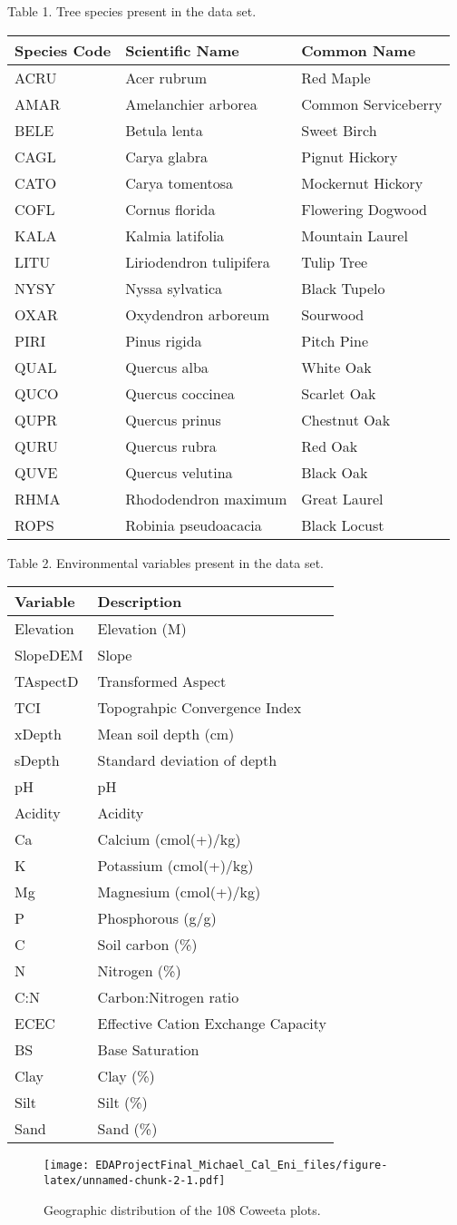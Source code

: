 \documentclass[
  12pt,
]{article}
\begin{document}
Table 1. Tree species present in the data set.

\begin{longtable}[]{@{}lll@{}}
\toprule
Species Code & Scientific Name & Common Name\tabularnewline
\midrule
\endhead
ACRU & Acer rubrum & Red Maple\tabularnewline
AMAR & Amelanchier arborea & Common Serviceberry\tabularnewline
BELE & Betula lenta & Sweet Birch\tabularnewline
CAGL & Carya glabra & Pignut Hickory\tabularnewline
CATO & Carya tomentosa & Mockernut Hickory\tabularnewline
COFL & Cornus florida & Flowering Dogwood\tabularnewline
KALA & Kalmia latifolia & Mountain Laurel\tabularnewline
LITU & Liriodendron tulipifera & Tulip Tree\tabularnewline
NYSY & Nyssa sylvatica & Black Tupelo\tabularnewline
OXAR & Oxydendron arboreum & Sourwood\tabularnewline
PIRI & Pinus rigida & Pitch Pine\tabularnewline
QUAL & Quercus alba & White Oak\tabularnewline
QUCO & Quercus coccinea & Scarlet Oak\tabularnewline
QUPR & Quercus prinus & Chestnut Oak\tabularnewline
QURU & Quercus rubra & Red Oak\tabularnewline
QUVE & Quercus velutina & Black Oak\tabularnewline
RHMA & Rhododendron maximum & Great Laurel\tabularnewline
ROPS & Robinia pseudoacacia & Black Locust\tabularnewline
\bottomrule
\end{longtable}

\newpage

Table 2. Environmental variables present in the data set.

\begin{longtable}[]{@{}ll@{}}
\toprule
Variable & Description\tabularnewline
\midrule
\endhead
Elevation & Elevation (M)\tabularnewline
SlopeDEM & Slope\tabularnewline
TAspectD & Transformed Aspect\tabularnewline
TCI & Topograhpic Convergence Index\tabularnewline
xDepth & Mean soil depth (cm)\tabularnewline
sDepth & Standard deviation of depth\tabularnewline
pH & pH\tabularnewline
Acidity & Acidity\tabularnewline
Ca & Calcium (cmol(+)/kg)\tabularnewline
K & Potassium (cmol(+)/kg)\tabularnewline
Mg & Magnesium (cmol(+)/kg)\tabularnewline
P & Phosphorous (g/g)\tabularnewline
C & Soil carbon (\%)\tabularnewline
N & Nitrogen (\%)\tabularnewline
C:N & Carbon:Nitrogen ratio\tabularnewline
ECEC & Effective Cation Exchange Capacity\tabularnewline
BS & Base Saturation\tabularnewline
Clay & Clay (\%)\tabularnewline
Silt & Silt (\%)\tabularnewline
Sand & Sand (\%)\tabularnewline
\bottomrule
\end{longtable}

\newpage

\begin{figure}
\centering
\texttt{[image: EDAProjectFinal\_Michael\_Cal\_Eni\_files/figure-latex/unnamed-chunk-2-1.pdf]}
\caption{Geographic distribution of the 108 Coweeta plots.}
\end{figure}
\end{document}
